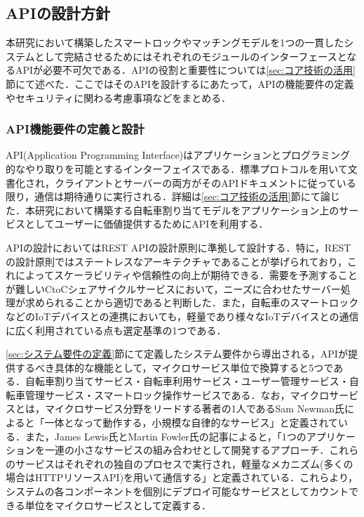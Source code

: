   \subsection{APIの設計方針}
    \label{sec:APIの設計方針}
      \par 本研究において構築したスマートロックやマッチングモデルを1つの一貫したシステムとして完結させるためにはそれぞれのモジュールのインターフェースとなるAPIが必要不可欠である．APIの役割と重要性については\ref{sec:コア技術の活用}節にて述べた．ここではそのAPIを設計するにあたって，APIの機能要件の定義やセキュリティに関わる考慮事項などをまとめる．
      
      \subsubsection{API機能要件の定義と設計}
        \label{sec:API機能要件の定義と設計}
          \par API(Application Programming Interface)はアプリケーションとプログラミング的なやり取りを可能とするインターフェイスである．標準プロトコルを用いて文書化され，クライアントとサーバーの両方がそのAPIドキュメントに従っている限り，通信は期待通りに実行される．詳細は\ref{sec:コア技術の活用}節にて論じた．本研究において構築する自転車割り当てモデルをアプリケーション上のサービスとしてユーザーに価値提供するためにAPIを利用する．
          \par APIの設計においてはREST APIの設計原則に準拠して設計する．特に，RESTの設計原則ではステートレスなアーキテクチャであることが挙げられており，これによってスケーラビリティや信頼性の向上が期待できる．需要を予測することが難しいCtoCシェアサイクルサービスにおいて，ニーズに合わせたサーバー処理が求められることから適切であると判断した．また，自転車のスマートロックなどのIoTデバイスとの連携においても，軽量であり様々なIoTデバイスとの通信に広く利用されている点も選定基準の1つである．
          \par \ref{sec:システム要件の定義}節にて定義したシステム要件から導出される，APIが提供するべき具体的な機能として，マイクロサービス単位で換算すると5つである．自転車割り当てサービス・自転車利用サービス・ユーザー管理サービス・自転車管理サービス・スマートロック操作サービスである．なお，マイクロサービスとは，マイクロサービス分野をリードする著者の1人であるSam Newman氏によると「一体となって動作する，小規模な自律的なサービス」と定義されている\cite{newman2021BuildingMicroservices}．また，James Lewis氏とMartin Fowler氏の記事によると，「1つのアプリケーションを一連の小さなサービスの組み合わせとして開発するアプローチ．これらのサービスはそれぞれの独自のプロセスで実行され，軽量なメカニズム(多くの場合はHTTPリソースAPI)を用いて通信する」と定義されている\cite{Microservices}．これらより，システムの各コンポーネントを個別にデプロイ可能なサービスとしてカウントできる単位をマイクロサービスとして定義する．
